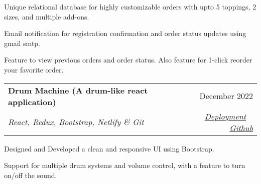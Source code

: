 \documentclass[a4paper,20pt]{article}
\makeatletter
\newcommand{\resumeSubheading}[4]{
  \vspace{-1pt}\item
    \begin{tabular*}{0.97\textwidth}{l@{\extracolsep{\fill}}r}
      \textbf{#1} & #2 \\
      \textit{#3} & \textit{#4} \\
    \end{tabular*}\vspace{-5pt}
}
\makeatother
\begin{document}
    
    \begin{description}[font=$\bullet$]
        \item {Unique relational database for highly customizable orders with upto 5 toppings, 2 sizes, and multiple add-ons.}
    \vspace{-3pt}
        \item {Email notification for registration confirmation and order status updates using gmail smtp.}
    \vspace{-3pt}
        \item {Feature to view previous orders and order status. Also feature for 1-click reorder your favorite order.}
    \end{description}

    \vspace{2pt}
    
    \resumeSubheading{Drum Machine (A drum-like react application)}{December 2022}
    {React, Redux, Bootstrap, Netlify \& Git}{\href{https://drumzz.netlify.app}{Deployment} ~ \href{https://github.com/satyamrs00/drum}{Github}}
    
    \begin{description}[font=$\bullet$]
        \item {Designed and Developed a clean and responsive UI using Bootstrap.}
    \vspace{-3pt}
        \item {Support for multiple drum systems and volume control, with a feature to turn on/off the sound.}
    \end{description}
    \vspace{2pt}

    

        
\end{document}

